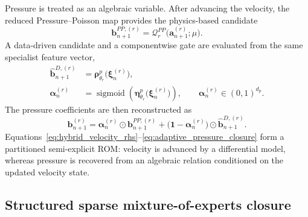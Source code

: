 Pressure is treated as an algebraic variable.  After advancing the velocity,
the reduced Pressure--Poisson map provides the physics-based candidate
\begin{equation}
  \boldsymbol{b}^{PP,(r)}_{n+1}
  =
  \mathscr{Q}^{PP}_{r}
  \bigl(\boldsymbol{a}^{(r)}_{n+1};\mu\bigr).
  \label{eq:pressure_poisson_base}
\end{equation}
A data-driven candidate and a componentwise gate are evaluated from the same
specialist feature vector,
\begin{align}
  \widehat{\boldsymbol{b}}^{D,(r)}_{n+1}
  &=
  \boldsymbol{\rho}^{p}_{\theta_r}
  \bigl(\boldsymbol{\xi}^{(r)}_n\bigr),
  \label{eq:data_driven_pressure_candidate}\\
  \boldsymbol{\alpha}^{(r)}_n
  &=
  \operatorname{sigmoid}
  \left(
    \boldsymbol{\eta}^{p}_{\theta_r}
    \bigl(\boldsymbol{\xi}^{(r)}_n\bigr)
  \right),
  \qquad
  \boldsymbol{\alpha}^{(r)}_n\in(0,1)^{d_p}.
  \label{eq:adaptive_pressure_gate}
\end{align}
The pressure coefficients are then reconstructed as
\begin{equation}
  \boldsymbol{b}^{(r)}_{n+1}
  =
  \boldsymbol{\alpha}^{(r)}_n\odot
  \boldsymbol{b}^{PP,(r)}_{n+1}
  +
  \bigl(\boldsymbol{1}-\boldsymbol{\alpha}^{(r)}_n\bigr)
  \odot
  \widehat{\boldsymbol{b}}^{D,(r)}_{n+1}.
  \label{eq:adaptive_pressure_closure}
\end{equation}
Equations~\eqref{eq:hybrid_velocity_rhs}--\eqref{eq:adaptive_pressure_closure}
form a partitioned semi-explicit ROM: velocity is advanced by a differential
model, whereas pressure is recovered from an algebraic relation conditioned
on the updated velocity state.

\subsection{Structured sparse mixture-of-experts closure}
\label{subsec:sparse_moe_features}

